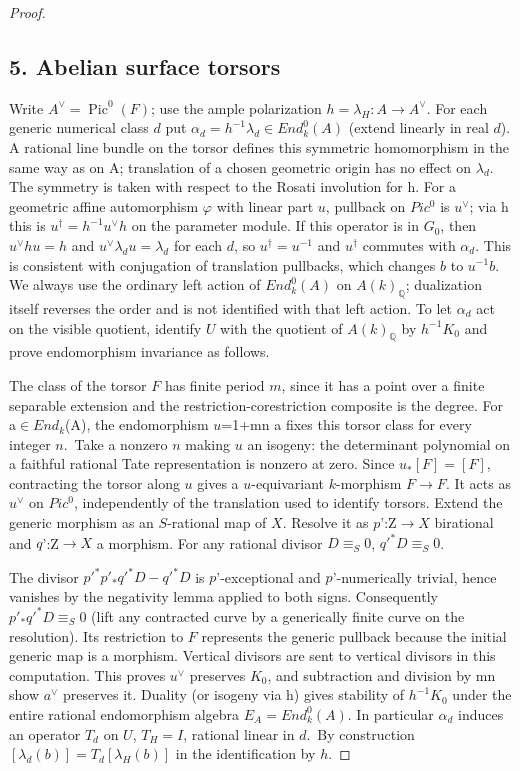 \documentclass[11pt]{article}
\begin{document}
\begin{proof}
\subsection*{5. Abelian surface torsors}

Write \(A^\vee=\operatorname{Pic}^0(F)\); use the ample polarization \(h=\lambda_H:A\to A^\vee\). For
each generic numerical class \(d\) put \(\alpha_d=h^{-1}\lambda_d\in End_k^0(A)\) (extend linearly in
real \(d\)). A rational line bundle on the torsor defines this symmetric homomorphism in the same way as
on A; translation of a chosen geometric origin has no effect on \(\lambda_d\). The symmetry is taken with
respect to the Rosati involution for h. For a geometric affine automorphism \(\varphi\) with linear part
\(u\), pullback on \(Pic^0\) is \(u^\vee\); via h this is \(u^\dagger=h^{-1}u^\vee h\) on the parameter
module. If this operator is in \(G_0\), then \(u^\vee h u=h\) and \(u^\vee\lambda_d u=\lambda_d\) for
each \(d\), so \(u^\dagger=u^{-1}\) and \(u^\dagger\) commutes with \(\alpha_d\). This is consistent with
conjugation of translation pullbacks, which changes \(b\) to \(u^{-1}b\). We always use the ordinary left
action of \(End_k^0(A)\) on \(A(k)_{\mathbb Q}\); dualization itself reverses the order and is not
identified with that left action. To let \(\alpha_d\) act on the visible quotient, identify \(U\) with
the quotient of \(A(k)_{\mathbb Q}\) by \(h^{-1}K_0\) and prove endomorphism invariance as follows.

The class of the torsor \(F\) has finite period \(m\), since it has a point over a finite separable
extension and the restriction-corestriction composite is the degree. For a\(\in End_k\)(A), the
endomorphism \(u\)=1+mn a fixes this torsor class for every integer \(n\).~Take a nonzero \(n\) making
\(u\) an isogeny: the determinant polynomial on a faithful rational Tate representation is nonzero at
zero. Since \(u_*[F]=[F]\), contracting the torsor along \(u\) gives a \(u\)-equivariant \(k\)-morphism
\(F\to F\). It acts as \(u^\vee\) on \(Pic^0\), independently of the translation used to identify
torsors. Extend the generic morphism as an \(S\)-rational map of \(X\). Resolve it as
\(p\)':Z\(\to X\) birational and \(q\)':Z\(\to X\) a morphism. For any rational divisor
\(D\equiv_S0\), \(q'^*D\equiv_S0\).

The divisor \(p'^*p'_*q'^*D-q'^*D\) is \(p\)'-exceptional and \(p\)'-numerically trivial, hence vanishes
by the negativity lemma applied to both signs. Consequently \(p'_*q'^*D\equiv_S0\) (lift any
contracted curve by a generically finite curve on the resolution). Its restriction to \(F\) represents
the generic pullback because the initial generic map is a morphism. Vertical divisors are sent to
vertical divisors in this computation. This proves \(u^\vee\) preserves \(K_0\), and subtraction and
division by mn show \(a^\vee\) preserves it. Duality (or isogeny via h) gives stability of
\(h^{-1}K_0\) under the entire rational endomorphism algebra \(E_A=End_k^0(A)\). In particular
\(\alpha_d\) induces an operator \(T_d\) on \(U\), \(T_H=I\), rational linear in \(d\).~By construction
\([\lambda_d(b)]=T_d[\lambda_H(b)]\) in the identification by \(h\).


\end{proof}
\end{document}
